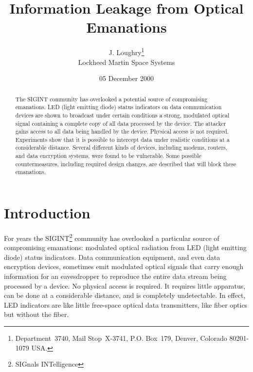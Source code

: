 \documentclass[twocolumn]{article}
\begin{document}


\title{Information Leakage from Optical Emanations}

\author{J. Loughry\thanks{Department~3740, Mail Stop~X-3741, P.O.
Box~179, Denver, Colorado 80201-1079 USA.} \\
Lockheed Martin Space Systems}

\date{05 December 2000}


\begin{abstract}

The SIGINT community has overlooked a potential source of compromising emanations.  LED (light emitting diode) status indicators on data communication devices are shown to broadcast under certain conditions a strong, modulated optical signal containing a complete copy of all data processed by the device.  The attacker gains access to all data being handled by the device.  Physical access is not required.  Experiments show that it is possible to intercept data under realistic conditions at a considerable distance.  Several different kinds of devices, including modems, routers, and data encryption systems, were found to be vulnerable.  Some possible countermeasures, including required design changes, are described that will block these emanations.

\end{abstract}

\maketitle

\section{Introduction}

For years the SIGINT\footnote{SIGnals INTelligence} community has overlooked a particular source of compromising emanations: modulated optical radiation from LED (light emitting diode) status indicators.  Data communication equipment, and even data encryption devices, sometimes emit modulated optical signals that carry enough information for an eavesdropper to reproduce the entire data stream being processed by a device.  No physical access is required.  It requires little apparatus, can be done at a considerable distance, and is completely undetectable.  In effect, LED indicators are like little free-space optical data transmitters, like fiber optics but without the fiber.
\end{document}
